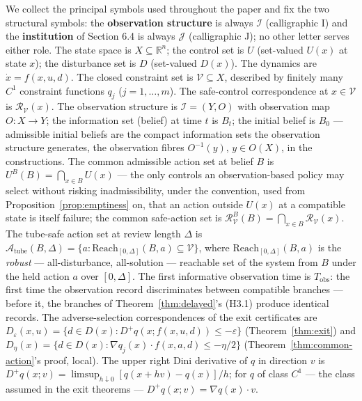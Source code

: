 \documentclass[10pt,twocolumn]{article}
\theoremstyle{definition}
\begin{document}
We collect the principal symbols used throughout the paper and fix the two structural symbols: the \textbf{observation structure} is always
\(\mathcal{I}\) (calligraphic I) and the \textbf{institution} of Section
6.4 is always \(\mathcal{J}\) (calligraphic J); no other letter serves either role. The state space is \(X \subseteq \mathbb{R}^n\); the
control set is \(U\) (set-valued \(U(x)\) at state \(x\)); the
disturbance set is \(D\) (set-valued \(D(x)\)). The dynamics are
\(\dot x = f(x,u,d)\). The closed constraint set is
\(\mathcal{V} \subseteq X\), described by finitely many \(C^1\)
constraint functions \(q_j\) (\(j = 1,\ldots,m\)). The safe-control
correspondence at \(x \in \mathcal{V}\) is
\(\mathcal{R}_{\mathcal{V}}(x)\). The observation structure is
\(\mathcal{I} = (Y, O)\) with observation map \(O : X \to Y\); the
information set (belief) at time \(t\) is \(B_t\); the initial belief is
\(B_0\) --- admissible initial beliefs are the compact information sets
the observation structure generates, the observation fibres
\(O^{-1}(y)\), \(y \in O(X)\), in the constructions. The common
admissible action set at belief \(B\) is
\(U^B(B) = \bigcap_{x \in B} U(x)\) --- the only controls an
observation-based policy may select without risking inadmissibility,
under the convention, used from Proposition~\ref{prop:emptiness} on, that an action outside
\(U(x)\) at a compatible state is itself failure; the common safe-action
set is
\(\mathcal{R}_{\mathcal{V}}^B(B) = \bigcap_{x \in B} \mathcal{R}_{\mathcal{V}}(x)\).
The tube-safe action set at review length \(\Delta\) is
\(\mathcal{A}_{\mathrm{tube}}(B, \Delta) = \{ a : \mathrm{Reach}_{[0,\Delta]}(B, a) \subseteq \mathcal{V} \}\),
where \(\mathrm{Reach}_{[0,\Delta]}(B, a)\) is the \emph{robust} ---
all-disturbance, all-solution --- reachable set of the system from \(B\) under the
held action \(a\) over \([0,\Delta]\). The first informative observation
time is \(T_{\mathrm{obs}}\): the first time the observation record
discriminates between compatible branches --- before it, the branches of
Theorem~\ref{thm:delayed}'s (H3.1) produce identical records. The adverse-selection
correspondences of the exit certificates are
\(D_{\varepsilon}(x,u) = \{ d \in D(x) : D^+ q(x; f(x,u,d)) \le -\varepsilon \}\)
(Theorem~\ref{thm:exit}) and
\(D_{\eta}(x) = \{ d \in D(x) : \nabla q_j(x) \cdot f(x, a, d) \le -\eta/2 \}\)
(Theorem~\ref{thm:common-action}'s proof, local). The upper
right Dini derivative of \(q\) in direction \(v\) is
\(D^+ q(x; v) = \limsup_{h \downarrow 0} [q(x + hv) - q(x)]/h\); for
\(q\) of class \(C^1\) --- the class assumed in the exit theorems ---
\(D^+ q(x; v) = \nabla q(x) \cdot v\).
\end{document}
